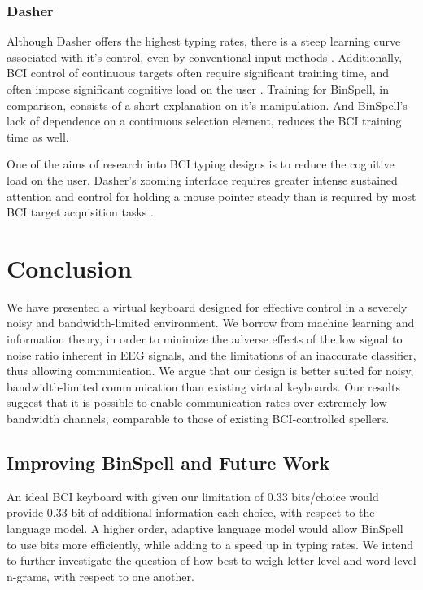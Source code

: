 \documentclass[12pt,titlepage]{article}
\begin{document}
\subsubsection{Dasher}

Although Dasher offers the highest typing rates, there is a steep learning curve associated with 
it's control, even by conventional input methods \cite{felton2007neural}.  Additionally, BCI control of continuous 
targets often require significant training time, and often impose significant cognitive load on 
the user \cite{felton2007neural}.  Training for BinSpell, in comparison, consists of a short explanation on it's 
manipulation.  And BinSpell's lack of dependence on a continuous selection element, reduces 
the BCI training time as well.

One of the aims of research into BCI typing designs is to reduce the cognitive load on the user.  Dasher's zooming interface requires greater intense sustained attention and control for 
holding a mouse pointer steady than is required by most BCI target acquisition tasks \cite{felton2007neural}.

\section{Conclusion}

We have presented a virtual keyboard designed for effective control in a severely noisy and
bandwidth-limited environment.  We borrow from machine learning and  information theory, in 
order to minimize the adverse effects of the low signal to noise ratio inherent in EEG signals, 
and the limitations of an inaccurate classifier, thus allowing communication.  We argue that our 
design is better suited for noisy, bandwidth-limited communication than existing virtual 
keyboards. Our results suggest that it is possible to enable communication rates over extremely 
low bandwidth channels, comparable to those of existing BCI-controlled spellers.


\subsection{Improving BinSpell and Future Work}

An ideal BCI keyboard with given our limitation of 0.33 bits/choice would provide 0.33 bit of 
additional information each choice, with respect to the language model.  A higher order, adaptive 
language model would allow BinSpell to use bits more efficiently, while adding to a speed up in typing 
rates.  We intend to further investigate the question of how best to weigh letter-level and word-level n-grams, with respect to one another. 
\end{document}
